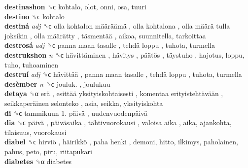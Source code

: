 \textbf{destinashon} ␝ϲ  kohtalo, olot, onni, osa, tuuri  \\
\textbf{destino} ␝ϲ  kohtalo  \\
\textbf{destiná} \emph{adj}  ␝ϲ   olla kohtalon määräämä ,  olla kohtalona ,  olla määrä tulla joksikin ,  olla määrätty ,  täsmentää , aikoa, suunnitella, tarkoittaa  \\
\textbf{destrosá} \emph{adj}  ␝ϲ   panna maan tasalle ,  tehdä loppu , tuhota, turmella  \\
\textbf{destrukshon} \emph{n}  ␝ϲ   hävittäminen ,  hävitys ,  päätös ,  täystuho , hajotus, loppu, tuho, tuhoaminen  \\
\textbf{destruí} \emph{adj}  ␝ϲ   hävittää ,  panna maan tasalle ,  tehdä loppu , tuhota, turmella  \\
\textbf{desèmber} \emph{n}  ␝ϲ   jouluk. , joulukuu  \\
\textbf{detaya} ␝α   erä ,  esittää yksityiskohtaisesti ,  komentaa erityistehtävään ,  seikkaperäinen selonteko , asia, seikka, yksityiskohta  \\
\textbf{di} ␝ϲ   tammikuun  1. päivä ,  uudenvuodenpäivä   \\
\textbf{dia} ␝ϲ   päivä ,  päiväsaika ,  tähtivuorokausi ,  valoisa aika , aika, ajankohta, tilaisuus, vuorokausi  \\
\textbf{diabel} ␝ϲ   hirviö ,  häirikkö ,  paha henki , demoni, hitto, ilkimys, paholainen, pahus, peto, piru, riitapukari  \\
\textbf{diabetes} ␝α  diabetes  \\
